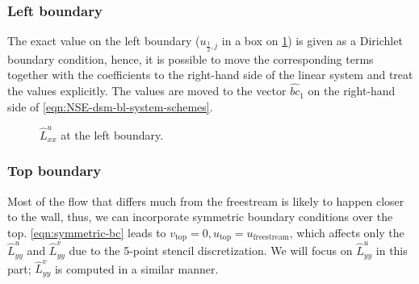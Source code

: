 \documentclass{article}
\numberwithin{equation}{section}
\begin{document}
\subsubsection{Left boundary}\label{subsubsec:laplacian-left}
The exact value on the left boundary ($u_{\frac{1}{2},j}$ in a box on \cref{fig:luxx-left}) is given as a Dirichlet boundary condition, hence, it is possible to move the corresponding terms together with the coefficients to the right-hand side of the linear system and treat the values explicitly. The values are moved to the vector $\hat{bc}_1$ on the right-hand side of \cref{eqn:NSE-dsm-bl-system-schemes}.
\begin{figure}[H] %
  \caption{$\hat{L}^u_{xx}$ at the left boundary.}\label{fig:luxx-left}
\end{figure}

\subsubsection{Top boundary}\label{subsubsec:laplacian-top}
Most of the flow that differs much from the freestream is likely to happen closer to the wall, thus, we can incorporate symmetric boundary conditions over the top. \cref{eqn:symmetric-bc} leads to $v_{\text{top}}=0, u_{\text{top}}=u_{\text{freestream}}$, which affects only the $\hat{L}^u_{yy}$ and $\hat{L}^v_{yy}$ due to the 5-point stencil discretization. We will focus on $\hat{L}^u_{yy}$ in this part; $\hat{L}^v_{yy}$ is computed in a similar manner. 
\end{document}
